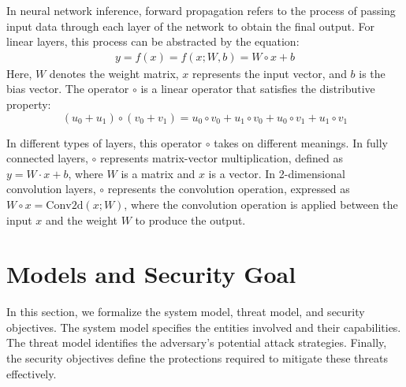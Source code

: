 \documentclass[conference]{IEEEtran}
\begin{document}
In neural network inference, forward propagation refers to the process of passing input data through each layer of the network to obtain the final output. For linear layers, this process can be abstracted by the equation:
\begin{equation*}
\begin{array}{c}
       y=f(x)=f(x;W,b)=W\circ x+b
\end{array}
\end{equation*}
Here, $W$ denotes the weight matrix, $x$ represents the input vector, and $b$ is the bias vector. The operator $\circ$ is a linear operator that satisfies the distributive property:
\begin{equation*}
       (u_0+u_1) \circ (v_0+v_1)=u_0 \circ v_0+u_1 \circ v_0+ u_0\circ v_1+ u_1\circ v_1
\end{equation*}

In different types of layers, this operator $\circ$ takes on different meanings. In fully connected layers, $\circ$ represents matrix-vector multiplication, defined as $y=W·x+b$, where $W$ is a matrix and $x$ is a vector. In 2-dimensional convolution layers, $\circ$ represents the convolution operation, expressed as $W\circ x=\text{Conv}2\text{d}(x;W)$, where the convolution operation is applied between the input $x$ and the weight $W$ to produce the output.

\section{Models and Security Goal}
In this section, we formalize the system model, threat model, and security objectives. The system model specifies the entities involved and their capabilities. The threat model identifies the adversary's potential attack strategies. Finally, the security objectives define the protections required to mitigate these threats effectively.
\end{document}
